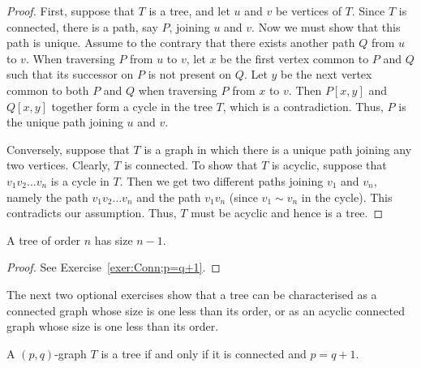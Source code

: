 \begin{proof}
First, suppose that $T$ is a tree, and let $u$ and $v$ be vertices of $T$. Since $T$ is connected, there is a path, say $P$, joining $u$ and $v$. Now we must show that this path is unique. Assume to the contrary that there exists another path $Q$ from $u$ to $v$. When traversing $P$ from $u$ to $v$, let $x$ be the first vertex common to $P$ and $Q$ such that its successor on $P$ is not present on $Q$. Let $y$ be the next vertex common to both $P$ and $Q$ when traversing $P$ from $x$ to $v$. Then $P[x,y]$ and $Q[x,y]$ together form a cycle in the tree $T$, which is a contradiction. Thus, $P$ is the unique path joining $u$ and $v$.

Conversely, suppose that $T$ is a graph in which there is a unique path joining any two vertices. Clearly, $T$ is connected. To show that $T$ is acyclic, suppose that $v_1 v_2 \ldots v_n$ is a cycle in $T$. Then we get two different paths joining $v_1$ and $v_n$, namely the path $v_1 v_2 \ldots v_n$ and the path $v_1 v_n$ (since $v_1 \sim v_n$ in the cycle). This contradicts our assumption. Thus, $T$ must be acyclic and hence is a tree.
\end{proof}

\begin{Theorem}
A tree of order $n$ has size $n - 1$.
\end{Theorem}

\begin{proof}
See Exercise~\ref{exer:Conn;p=q+1}.
\end{proof}

The next two optional exercises show that a tree can be characterised as a connected graph whose size is one less than its order, or as an acyclic connected graph whose size is one less than its order.

\begin{DExercise}\label{exer:Conn;p=q+1}
A $(p, q)$-graph $T$ is a tree if and only if it is connected and $p = q + 1$.
\end{DExercise}

